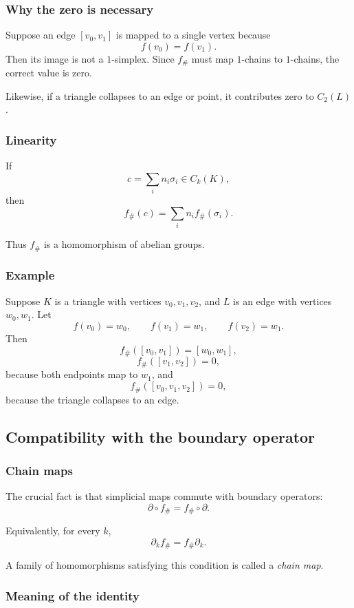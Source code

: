 \documentclass[12pt,a4paper]{article}
\theoremstyle{notespace}
\begin{document}
\subsubsection{Why the zero is necessary}

Suppose an edge \([v_0,v_1]\) is mapped to a single vertex because
\[
f(v_0)=f(v_1).
\]
Then its image is not a \(1\)-simplex. Since \(f_\#\) must map \(1\)-chains to \(1\)-chains, the correct value is zero.

Likewise, if a triangle collapses to an edge or point, it contributes zero to \(C_2(L)\).

\subsubsection{Linearity}

If
\[
c=\sum_i n_i\sigma_i\in C_k(K),
\]
then
\[
f_\#(c)=\sum_i n_i f_\#(\sigma_i).
\]

Thus \(f_\#\) is a homomorphism of abelian groups.

\subsubsection{Example}

Suppose \(K\) is a triangle with vertices \(v_0,v_1,v_2\), and \(L\) is an edge with vertices \(w_0,w_1\). Let
\[
f(v_0)=w_0,\qquad f(v_1)=w_1,\qquad f(v_2)=w_1.
\]
Then
\[
f_\#([v_0,v_1])=[w_0,w_1],
\]
\[
f_\#([v_1,v_2])=0,
\]
because both endpoints map to \(w_1\), and
\[
f_\#([v_0,v_1,v_2])=0,
\]
because the triangle collapses to an edge.

\subsection{Compatibility with the boundary operator}

\subsubsection{Chain maps}

The crucial fact is that simplicial maps commute with boundary operators:
\[
\partial \circ f_\# = f_\# \circ \partial.
\]

Equivalently, for every \(k\),
\[
\partial_k f_\# = f_\# \partial_k.
\]

A family of homomorphisms satisfying this condition is called a \emph{chain map}.

\subsubsection{Meaning of the identity}
\end{document}
